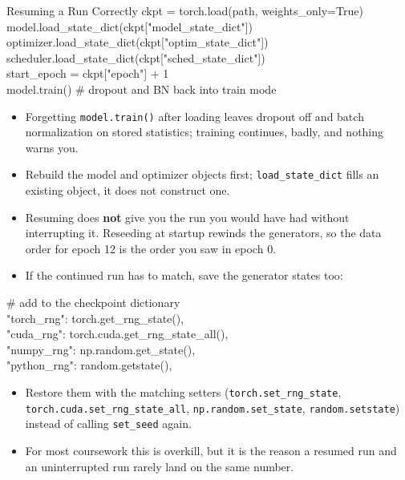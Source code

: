 \begin{frame}[allowframebreaks]{Resuming a Run Correctly}
    \ttfamily\footnotesize{
    ckpt = torch.load(path, weights\_only=True) \\
    model.load\_state\_dict(ckpt["model\_state\_dict"]) \\
    optimizer.load\_state\_dict(ckpt["optim\_state\_dict"]) \\
    scheduler.load\_state\_dict(ckpt["sched\_state\_dict"]) \\
    start\_epoch = ckpt["epoch"] + 1 \\
    model.train() \# dropout and BN back into train mode
    }
\vspace{1em}
\begin{itemize}
    \item Forgetting \texttt{model.train()} after loading leaves dropout off and batch normalization on stored statistics; training continues, badly, and nothing warns you.
    \item Rebuild the model and optimizer objects first; \texttt{load\_state\_dict} fills an existing object, it does not construct one.
\end{itemize}

\framebreak
\begin{itemize}
    \item Resuming does \textbf{not} give you the run you would have had without interrupting it. Reseeding at startup rewinds the generators, so the data order for epoch 12 is the order you saw in epoch 0.
    \item If the continued run has to match, save the generator states too:
\end{itemize}
\vspace{0.5em}
    \ttfamily\footnotesize{
    \# add to the checkpoint dictionary \\
    "torch\_rng": torch.get\_rng\_state(), \\
    "cuda\_rng": torch.cuda.get\_rng\_state\_all(), \\
    "numpy\_rng": np.random.get\_state(), \\
    "python\_rng": random.getstate(),
    }
\vspace{1em}
\begin{itemize}
    \item Restore them with the matching setters (\texttt{torch.set\_rng\_state}, \texttt{torch.cuda.set\_rng\_state\_all}, \texttt{np.random.set\_state}, \texttt{random.setstate}) instead of calling \texttt{set\_seed} again.
    \item For most coursework this is overkill, but it is the reason a resumed run and an uninterrupted run rarely land on the same number.
\end{itemize}
\end{frame}

